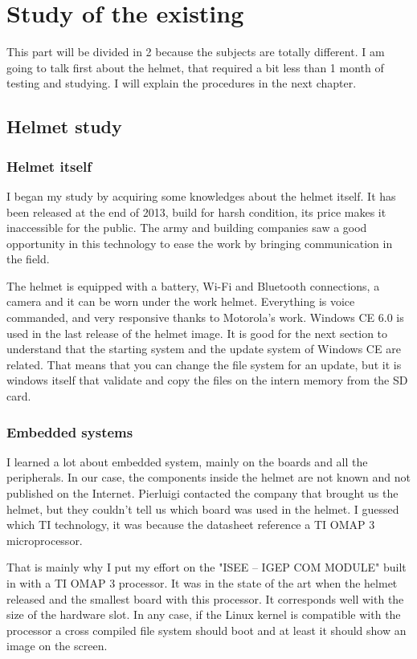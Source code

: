 \chapter[Studies]{Study of the existing}
 \par This part will be divided in 2 because the subjects are totally different. I am going to talk first about the helmet, that required a bit less than 1 month of testing and studying. I will explain the procedures in the next chapter. 
	
	\section{Helmet study}	
	\subsection{Helmet itself}
	\par I began my study by acquiring some knowledges about the helmet itself. It has been released at the end of 2013, build for harsh condition, its price makes it inaccessible for the public. The army and building companies saw a good opportunity in this technology to ease the work by bringing communication in the field.
	\par The helmet is equipped with a battery, Wi-Fi and Bluetooth connections, a camera and it can be worn under the work helmet. Everything is voice commanded, and very responsive thanks to Motorola's work. Windows CE 6.0 is used in the last release of the helmet image. It is good for the next section to understand that the starting system and the update system of Windows CE are related. That means that you can change the file system for an update, but it is windows itself that validate and copy the files on the intern memory from the SD card.
	\subsection{Embedded systems}
	\par I learned a lot about embedded system, mainly on the boards and all the peripherals. In our case, the components inside the helmet are not known and not published on the Internet. Pierluigi contacted the company that brought us the helmet, but they couldn't tell us which board was used in the helmet. I guessed which TI technology, it was because the datasheet reference a TI OMAP 3 microprocessor. 
	\par That is mainly why I put my effort on the "ISEE – IGEP COM MODULE" built in with a TI OMAP 3 processor. It was in the state of the art when the helmet released and the smallest board with this processor. It corresponds well with the size of the hardware slot. In any case, if the Linux kernel is compatible with the processor a cross compiled file system should boot and at least it should show an image on the screen.
	

